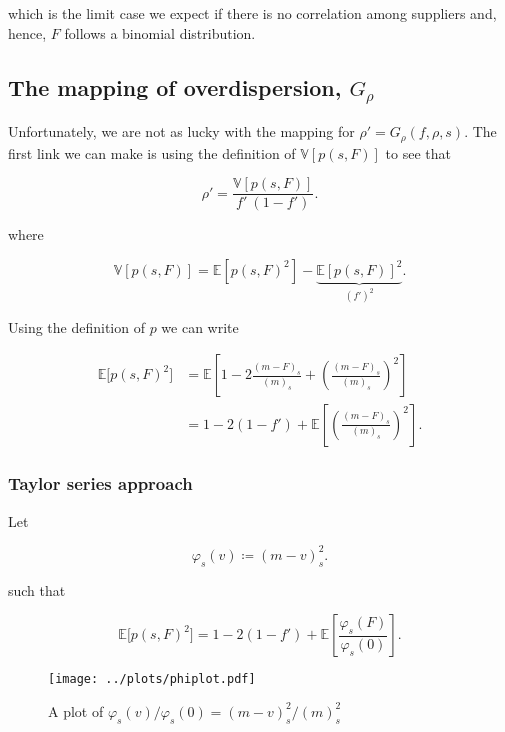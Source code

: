 \documentclass[american, abstract=on]{scrartcl}
\theoremstyle{plain}
\newcommand{\E}{\mathbb{E}}
\newcommand{\V}{\mathbb{V}}
\begin{document}
which is the limit case we expect if there is no correlation among suppliers and, hence, $F$ follows a binomial distribution.

\subsection{The mapping of overdispersion, $G_\rho$}

Unfortunately, we are not as lucky with the mapping for $\rho' = G_{\rho}(f, \rho, s)$. The first link we can make is using the definition of $\V[p(s, F)]$ to see that

\begin{equation}
    \rho' = \frac{\V[p(s, F)]}{f' \ (1 - f')}.
\end{equation}

where

\begin{equation}
    \V[p(s, F)] = \E[p(s, F)^2] - \underbrace{\E[p(s, F)]^2}_{\left(f'\right)^2}.
\end{equation}

Using the definition of $p$ we can write

\begin{equation}
    \begin{split}
        \E\big[ p(s, F)^2 \big] &= \E\left[1 - 2 \frac{(m - F)_s}{(m)_s} + \left(\frac{(m - F)_s}{(m)_s}  \right)^2\right] \\
        &= 1 - 2(1 - f') + \E\left[ \left(\frac{(m - F)_s}{(m)_s}  \right)^2 \right].
    \end{split}
\end{equation}

\subsubsection{Taylor series approach}

Let 

\begin{equation}
    \varphi_s(v) \coloneqq (m - v)^2_s.
\end{equation}

such that

\begin{equation}
    \E\big[ p(s, F)^2 \big] = 1 - 2(1 - f') + \E\left[ \frac{\varphi_s(F)}{\varphi_s(0)} \right].
\end{equation}

\begin{figure}[H]
    \centering
    \texttt{[image: ../plots/phiplot.pdf]} 
    \caption{A plot of $\varphi_s(v) / \varphi_s(0) = (m-v)^2_s / (m)^2_s$}
    \label{fig:phi}    
\end{figure}
\end{document}
